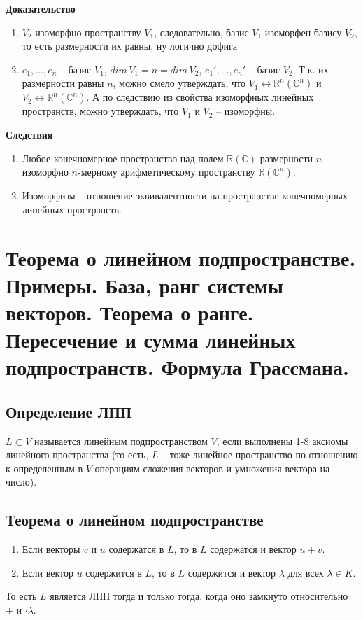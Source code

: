 \documentclass{article}
\newcommand{\R}{\mathbb R}
\begin{document}
\textbf{Доказательство}

\begin{enumerate}
    \item $V_2$ изоморфно пространству $V_1$, следовательно, базис $V_1$ изоморфен базису $V_2$, то есть размерности их равны, ну логично дофига
    \item $e_1,\ldots,e_n$ -- базис $V_1$, $dim\,V_1=n=dim\,V_2$, $e_1',\ldots,e_n'$ -- базис $V_2$. Т.к. их размерности равны $n$, можно смело утверждать, что $V_1\leftrightarrow \R^n (\mathbb{C}^n)$ и $V_2\leftrightarrow \R^n(\mathbb{C}^n)$. А по следствию из свойства изоморфных линейных пространств, можно утверждать, что $V_1$ и $V_2$ -- изоморфны.
\end{enumerate}
\textbf{Следствия}
\begin{enumerate}
    \item Любое конечномерное пространство над полем $\R(\mathbb{C})$ размерности $n$ изоморфно $n$-мерному арифметическому пространству $\R(\mathbb{C}^n)$.
    \item Изоморфизм -- отношение эквивалентности на пространстве конечномерных линейных пространств.
\end{enumerate}

\newpage
\section{Теорема о линейном подпространстве. Примеры. База, ранг системы векторов. Теорема о ранге. Пересечение и сумма линейных подпространств. Формула Грассмана.}
\subsection{Определение ЛПП}
$L\subset V$ называется линейным подпространством $V$, если выполнены 1-8 аксиомы линейного пространства (то есть, $L$ -- тоже линейное пространство по отношению к определенным в $V$ операциям сложения векторов и умножения вектора на число).

\subsection{Теорема о линейном подпространстве}
\begin{enumerate}
    \item Если векторы $v$ и $u$ содержатся в $L$, то в $L$ содержатся и вектор $u+v$.
    \item Если вектор $u$ содержится в $L$, то в $L$ содержится и вектор $\lambda$ для всех $\lambda\in K$.
\end{enumerate}
То есть $L$ является ЛПП тогда и только тогда, когда оно замкнуто относительно $+$ и $\cdot\lambda$.
\end{document}
